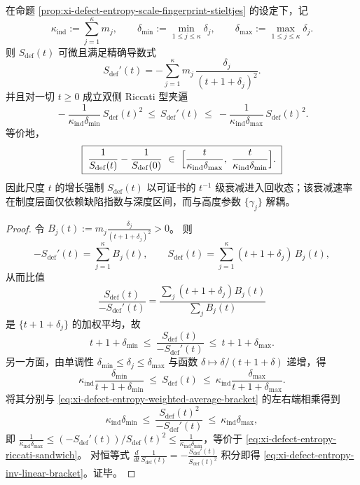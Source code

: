 \begin{proposition}\label{prop:xi-defect-entropy-riccati-sandwich}
在命题 \ref{prop:xi-defect-entropy-scale-fingerprint-stieltjes} 的设定下，记
\[
\kappa_{\mathrm{ind}}:=\sum_{j=1}^{\kappa}m_j,
\qquad
\delta_{\min}:=\min_{1\le j\le\kappa}\delta_j,
\qquad
\delta_{\max}:=\max_{1\le j\le\kappa}\delta_j.
\]
则 \(S_{\mathrm{def}}(t)\) 可微且满足精确导数式
\[
S_{\mathrm{def}}'(t)=-\sum_{j=1}^{\kappa}m_j\,\frac{\delta_j}{(t+1+\delta_j)^2}.
\]
并且对一切 \(t\ge 0\) 成立双侧 Riccati 型夹逼
\begin{equation}\label{eq:xi-defect-entropy-riccati-sandwich}
\boxed{\;
-\frac{1}{\kappa_{\mathrm{ind}}\delta_{\min}}\,S_{\mathrm{def}}(t)^2
\ \le\
S_{\mathrm{def}}'(t)
\ \le\
-\frac{1}{\kappa_{\mathrm{ind}}\delta_{\max}}\,S_{\mathrm{def}}(t)^2.\;}
\end{equation}
等价地，
\begin{equation}\label{eq:xi-defect-entropy-inv-linear-bracket}
\boxed{\;
\frac{1}{S_{\mathrm{def}}(t)}-\frac{1}{S_{\mathrm{def}}(0)}
\ \in\
\Bigl[\frac{t}{\kappa_{\mathrm{ind}}\delta_{\max}},\ \frac{t}{\kappa_{\mathrm{ind}}\delta_{\min}}\Bigr].\;}
\end{equation}
因此尺度 \(t\) 的增长强制 \(S_{\mathrm{def}}(t)\) 以可证书的 \(t^{-1}\) 级衰减进入回收态；该衰减速率在制度层面仅依赖缺陷指数与深度区间，而与高度参数 \(\{\gamma_j\}\) 解耦。
\end{proposition}
\begin{proof}
令
\(
B_j(t):=m_j\frac{\delta_j}{(t+1+\delta_j)^2}>0
\)。
则
\[
-S_{\mathrm{def}}'(t)=\sum_{j=1}^{\kappa}B_j(t),
\qquad
S_{\mathrm{def}}(t)=\sum_{j=1}^{\kappa}(t+1+\delta_j)\,B_j(t),
\]
从而比值
\[
\frac{S_{\mathrm{def}}(t)}{-S_{\mathrm{def}}'(t)}
=\frac{\sum_j (t+1+\delta_j)B_j(t)}{\sum_j B_j(t)}
\]
是 \(\{t+1+\delta_j\}\) 的加权平均，故
\begin{equation}\label{eq:xi-defect-entropy-weighted-average-bracket}
t+1+\delta_{\min}
\ \le\
\frac{S_{\mathrm{def}}(t)}{-S_{\mathrm{def}}'(t)}
\ \le\
t+1+\delta_{\max}.
\end{equation}
另一方面，由单调性 \(\delta_{\min}\le \delta_j\le \delta_{\max}\) 与函数 \(\delta\mapsto \delta/(t+1+\delta)\) 递增，得
\[
\kappa_{\mathrm{ind}}\frac{\delta_{\min}}{t+1+\delta_{\min}}
\ \le\
S_{\mathrm{def}}(t)
\ \le\
\kappa_{\mathrm{ind}}\frac{\delta_{\max}}{t+1+\delta_{\max}}.
\]
将其分别与 \eqref{eq:xi-defect-entropy-weighted-average-bracket} 的左右端相乘得到
\[
\kappa_{\mathrm{ind}}\delta_{\min}
\ \le\
\frac{S_{\mathrm{def}}(t)^2}{-S_{\mathrm{def}}'(t)}
\ \le\
\kappa_{\mathrm{ind}}\delta_{\max},
\]
即
\(
\frac{1}{\kappa_{\mathrm{ind}}\delta_{\max}}
\le
(-S_{\mathrm{def}}'(t))/S_{\mathrm{def}}(t)^2
\le
\frac{1}{\kappa_{\mathrm{ind}}\delta_{\min}}
\)，等价于 \eqref{eq:xi-defect-entropy-riccati-sandwich}。
对恒等式
\(
\frac{d}{dt}\frac{1}{S_{\mathrm{def}}(t)}=-\frac{S_{\mathrm{def}}'(t)}{S_{\mathrm{def}}(t)^2}
\)
积分即得 \eqref{eq:xi-defect-entropy-inv-linear-bracket}。证毕。
\end{proof}

\endinput

